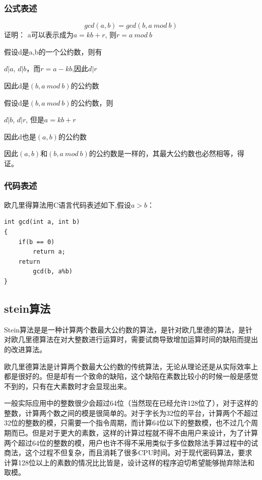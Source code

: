 \documentclass[12pt]{article}
\begin{document}
\subsubsection{公式表述}
$$gcd(a,b) = gcd(b,a~mod~b)$$
证明： a可以表示成为$a = kb+r$, 则$r = a~mod~b$

假设d是a,b的一个公约数，则有

$d|a$, $d|b$，而$r = a-kb$,因此$d|r$

因此d是$(b,a~mod~b)$的公约数

假设d是$(b,a~mod~b)$的公约数，则

$d|b$, $d|r$, 但是$a = kb+r$

因此d也是$(a,b)$的公约数

因此$(a,b)$和$(b,a~mod~b)$的公约数是一样的，其最大公约数也必然相等，得证。

\subsubsection{代码表述}
欧几里得算法用C语言代码表述如下,假设$a>b$：
\lstset{language=C}
\begin{lstlisting}
int gcd(int a, int b)
{
	if(b == 0)
		return a;
	return
		gcd(b, a%b)
}
\end{lstlisting}

\subsection{stein算法}

Stein算法是是一种计算两个数最大公约数的算法，是针对欧几里德的算法，是针对欧几里德算法在对大整数进行运算时，需要试商导致增加运算时间的缺陷而提出的改进算法。

欧几里德算法是计算两个数最大公约数的传统算法，无论从理论还是从实际效率上都是很好的。但是却有一个致命的缺陷，这个缺陷在素数比较小的时候一般是感觉不到的，只有在大素数时才会显现出来。

一般实际应用中的整数很少会超过64位（当然现在已经允许128位了），对于这样的整数，计算两个数之间的模是很简单的。对于字长为32位的平台，计算两个不超过32位的整数的模，只需要一个指令周期，而计算64位以下的整数模，也不过几个周期而已。但是对于更大的素数，这样的计算过程就不得不由用户来设计，为了计算两个超过64位的整数的模，用户也许不得不采用类似于多位数除法手算过程中的试商法，这个过程不但复杂，而且消耗了很多CPU时间。对于现代密码算法，要求计算128位以上的素数的情况比比皆是，设计这样的程序迫切希望能够抛弃除法和取模。
\end{document}

